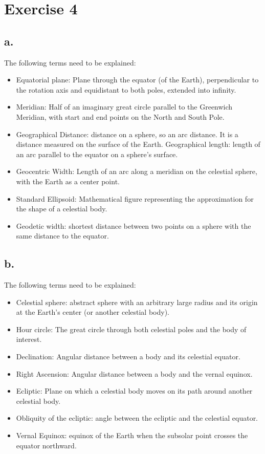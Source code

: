 \section{Exercise 4}
\subsection*{a.}
The following terms need to be explained:
\begin{itemize}
    \item Equatorial plane: Plane through the equator (of the Earth), perpendicular to the rotation axis and equidistant to both poles, extended into infinity.
    \item Meridian: Half of an imaginary great circle parallel to the Greenwich Meridian, with start and end points on the North and South Pole.
    \item Geographical Distance: distance on a sphere, so an arc distance. It is a distance measured on the surface of the Earth. Geographical length: length of an arc parallel to the equator on a sphere's surface.
    \item Geocentric Width: Length of an arc along a meridian on the celestial sphere, with the Earth as a center point.
    \item Standard Ellipsoid: Mathematical figure representing the approximation for the shape of a celestial body.
    \item Geodetic width: shortest distance between two points on a sphere with the same distance to the equator.
\end{itemize}

\subsection*{b.}
The following terms need to be explained:
\begin{itemize}
    \item Celestial sphere: abstract sphere with an arbitrary large radius and its origin at the Earth's center (or another celestial body).
    \item Hour circle: The great circle through both celestial poles and the body of interest.
    \item Declination: Angular distance between a body and its celestial equator.
    \item Right Ascension: Angular distance between a body and the vernal equinox.
    \item Ecliptic: Plane on which a celestial body moves on its path around another celestial body.
    \item Obliquity of the ecliptic: angle between the ecliptic and the celestial equator.
    \item Vernal Equinox: equinox of the Earth when the subsolar point crosses the equator northward. 
\end{itemize}

